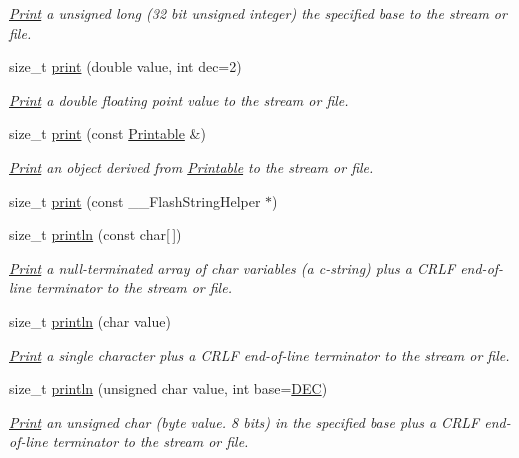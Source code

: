 \begin{DoxyCompactItemize}
\begin{DoxyCompactList}\small\item\em \hyperlink{class_print}{Print} a unsigned long (32 bit unsigned integer) the specified base to the stream or file. \end{DoxyCompactList}\item 
size\+\_\+t \hyperlink{class_print_ad89472bdb6539423a42d350beec02ff4}{print} (double value, int dec=2)
\begin{DoxyCompactList}\small\item\em \hyperlink{class_print}{Print} a double floating point value to the stream or file. \end{DoxyCompactList}\item 
size\+\_\+t \hyperlink{class_print_a901b0f06ae34aab31b8fbb4298f0596e}{print} (const \hyperlink{class_printable}{Printable} \&)
\begin{DoxyCompactList}\small\item\em \hyperlink{class_print}{Print} an object derived from \hyperlink{class_printable}{Printable} to the stream or file. \end{DoxyCompactList}\item 
size\+\_\+t \hyperlink{class_print_aa4158dd94bc1741f92d99c427261d7c0}{print} (const \+\_\+\+\_\+\+Flash\+String\+Helper $\ast$)
\item 
size\+\_\+t \hyperlink{class_print_ad337ce3f7977411b7d34d47a51e5737e}{println} (const char\mbox{[}$\,$\mbox{]})
\begin{DoxyCompactList}\small\item\em \hyperlink{class_print}{Print} a null-\/terminated array of char variables (a c-\/string) plus a C\+R\+LF end-\/of-\/line terminator to the stream or file. \end{DoxyCompactList}\item 
size\+\_\+t \hyperlink{class_print_a80fdd92db4b396062586bcb3e08d3835}{println} (char value)
\begin{DoxyCompactList}\small\item\em \hyperlink{class_print}{Print} a single character plus a C\+R\+LF end-\/of-\/line terminator to the stream or file. \end{DoxyCompactList}\item 
size\+\_\+t \hyperlink{class_print_a000b3fd5b723cb6c7db0d3231a9ef2f8}{println} (unsigned char value, int base=\hyperlink{docs_2src_2spark__wiring__print_8h_a26e216c38cffa0a9965fa7933ba558b1}{D\+EC})
\begin{DoxyCompactList}\small\item\em \hyperlink{class_print}{Print} an unsigned char (byte value. 8 bits) in the specified base plus a C\+R\+LF end-\/of-\/line terminator to the stream or file. \end{DoxyCompactList}\item 

\end{DoxyCompactItemize}
